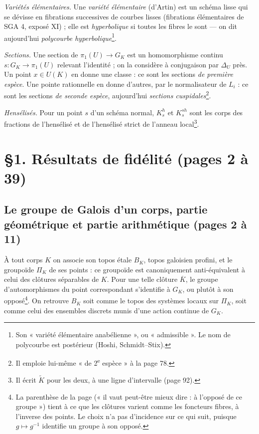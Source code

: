 \documentclass[11pt,a4paper]{article}
\begin{document}
\emph{Variétés élémentaires.} Une \emph{variété élémentaire} (d'Artin) est un
schéma lisse qui se dévisse en fibrations successives de courbes lisses
(fibrations élémentaires de SGA 4, exposé XI) ; elle est \emph{hyperbolique}
si toutes les fibres le sont — on dit aujourd'hui \emph{polycourbe
hyperbolique}\footnote{Son « variété élémentaire anabélienne », ou
« admissible ». Le nom de polycourbe est postérieur (Hoshi, Schmidt–Stix).}.

\emph{Sections.} Une section de $\pi_1(U) \to G_K$ est un homomorphisme
continu $s : G_K \to \pi_1(U)$ relevant l'identité ; on la considère à
conjugaison par $\Delta_U$ près. Un point $x \in U(K)$ en donne une classe :
ce sont les sections \emph{de première espèce}. Une pointe rationnelle en
donne d'autres, par le normalisateur de $L_i$ : ce sont les sections
\emph{de seconde espèce}, aujourd'hui \emph{sections cuspidales}\footnote{Il
emploie lui-même « de 2\textsuperscript{e} espèce » à la page 78.}.

\emph{Hensélisés.} Pour un point $s$ d'un schéma normal, $K^{h}_s$ et
$K^{sh}_s$ sont les corps des fractions de l'hensélisé et de l'hensélisé
strict de l'anneau local\footnote{Il écrit $\tilde K$ pour les deux, à une
ligne d'intervalle (page 92).}.

\section*{§1. Résultats de fidélité (pages 2 à 39)}

\subsection*{Le groupe de Galois d'un corps, partie géométrique et partie arithmétique (pages 2 à 11)}

À tout corps $K$ on associe son topos étale $B_K$, topos galoisien
profini, et le groupoïde $\Pi_K$ de ses points : ce groupoïde est
canoniquement anti-équivalent à celui des clôtures séparables de $K$. Pour une
telle clôture $\overline{K}$, le groupe d'automorphismes du point
correspondant s'identifie à $G_K$, ou plutôt à son opposé\footnote{La
parenthèse de la page (« il vaut peut-être mieux dire : à l'opposé de ce
groupe ») tient à ce que les clôtures varient comme les foncteurs fibres, à
l'inverse des points. Le choix n'a pas d'incidence sur ce qui suit, puisque
$g \mapsto g^{-1}$ identifie un groupe à son opposé.}. On retrouve $B_K$
soit comme le topos des systèmes locaux sur $\Pi_K$, soit comme celui des
ensembles discrets munis d'une action continue de $G_K$.
\end{document}
